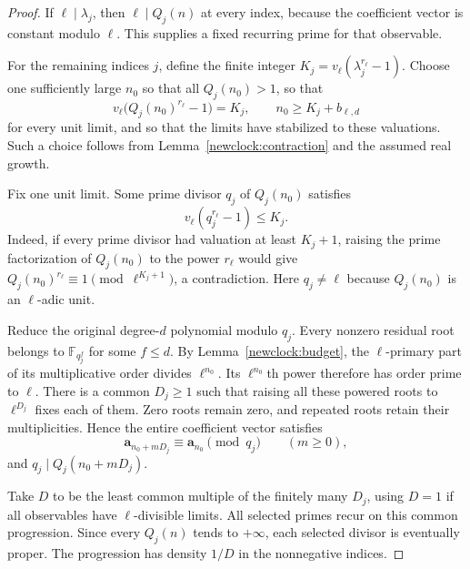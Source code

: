 \documentclass[11pt,a4paper]{article}
\theoremstyle{definition}\newtheorem{definition}[theorem]{Definition}
\theoremstyle{remark}\newtheorem{remark}[theorem]{Remark}
\begin{document}
\begin{proof}
If $\ell\mid\lambda_j$, then $\ell\mid Q_j(n)$ at every index,
because the coefficient vector is constant modulo $\ell$.
This supplies a fixed recurring prime for that observable.

For the remaining indices $j$, define the finite integer
$K_j=v_\ell(\lambda_j^{r_\ell}-1)$.  Choose one sufficiently
large $n_0$ so that all $Q_j(n_0)>1$, so that
\[
 v_\ell\bigl(Q_j(n_0)^{r_\ell}-1\bigr)=K_j,
 \qquad n_0\ge K_j+b_{\ell,d}
\]
for every unit limit, and so that the limits have stabilized to
these valuations.  Such a choice follows from
Lemma~\ref{newclock:contraction} and the assumed real growth.

Fix one unit limit.  Some prime divisor $q_j$ of $Q_j(n_0)$
satisfies
\[
 v_\ell(q_j^{r_\ell}-1)\le K_j.
\]
Indeed, if every prime divisor had valuation at least $K_j+1$,
raising the prime factorization of $Q_j(n_0)$ to the power
$r_\ell$ would give $Q_j(n_0)^{r_\ell}\equiv1
\pmod{\ell^{K_j+1}}$, a contradiction.  Here $q_j\ne\ell$
because $Q_j(n_0)$ is an $\ell$-adic unit.

Reduce the original degree-$d$ polynomial modulo $q_j$.
Every nonzero residual root belongs to $\mathbb F_{q_j^f}$
for some $f\le d$.  By Lemma~\ref{newclock:budget}, the
$\ell$-primary part of its multiplicative order divides
$\ell^{n_0}$.  Its $\ell^{n_0}$th power therefore has order
prime to $\ell$.  There is a common $D_j\ge1$ such that raising
all these powered roots to $\ell^{D_j}$ fixes each of them.
Zero roots remain zero, and repeated roots retain their
multiplicities.  Hence the entire coefficient vector satisfies
\[
 \boldsymbol a_{n_0+mD_j}\equiv\boldsymbol a_{n_0}
                  \pmod{q_j}\qquad(m\ge0),
\]
and $q_j\mid Q_j(n_0+mD_j)$.

Take $D$ to be the least common multiple of the finitely many
$D_j$, using $D=1$ if all observables have $\ell$-divisible
limits.  All selected primes recur on this common progression.
Since every $Q_j(n)$ tends to $+\infty$, each selected divisor
is eventually proper.  The progression has density $1/D$ in
the nonnegative indices.
\end{proof}
\end{document}
